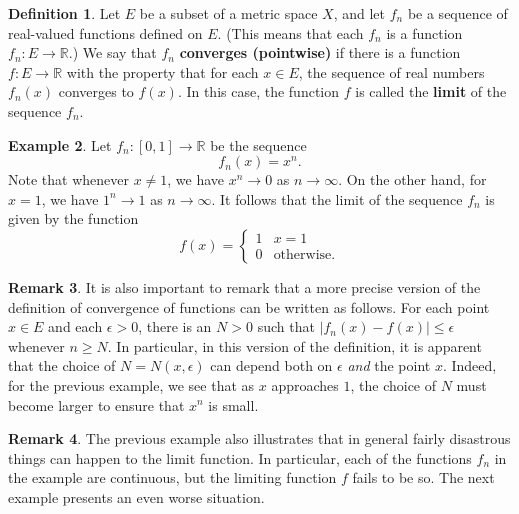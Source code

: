 \documentclass[12pt]{article}
\theoremstyle{definition}
\newtheorem{definition}{Definition}
\newtheorem{example}[definition]{Example}
\newtheorem{remark}[definition]{Remark}
\theoremstyle{theorem}
\begin{document}
\begin{definition}
Let $E$ be a subset of a metric space $X$, and let $f_n$ be a sequence of real-valued functions defined on $E$. (This means that each $f_n$ is a function $f_n : E \to \mathbb{R}$.) We say that $f_n$ \textbf{converges (pointwise)} if there is a function $f : E \to \mathbb{R}$ with the property that for each $x \in E$, the sequence of real numbers $f_n(x)$ converges to $f(x)$. In this case, the function $f$ is called the \textbf{limit} of the sequence $f_n$. 
\end{definition}

\begin{example}
Let $f_n : [0,1] \to \mathbb{R}$ be the sequence 
\[
f_n(x) = x^n.
\]
Note that whenever $x \ne 1$, we have $x^n \to 0$ as $n \to \infty$. On the other hand, for $x = 1$, we have $1^n \to 1$ as $n \to \infty$. It follows that the limit of the sequence $f_n$ is given by the function 
\[
f(x) = \begin{cases}
1 & x = 1 \\
0 & \text{otherwise}.
\end{cases}
\]
\end{example}

\begin{remark}
It is also important to remark that a more precise version of the definition of convergence of functions can be written as follows. For each point $x \in E$ and each $\epsilon > 0$, there is an $N > 0$ such that $|f_n(x) - f(x)| \leqslant \epsilon$ whenever $n \geqslant N$. In particular, in this version of the definition, it is apparent that the choice of $N = N(x,\epsilon)$ can depend both on $\epsilon$ \emph{and} the point $x$. Indeed, for the previous example, we see that as $x$ approaches $1$, the choice of $N$ must become larger to ensure that $x^n$ is small. 
\end{remark}

\begin{remark}
The previous example also illustrates that in general fairly disastrous things can happen to the limit function. In particular, each of the functions $f_n$ in the example are continuous, but the limiting function $f$ fails to be so. The next example presents an even worse situation. 
\end{remark}
\end{document}
